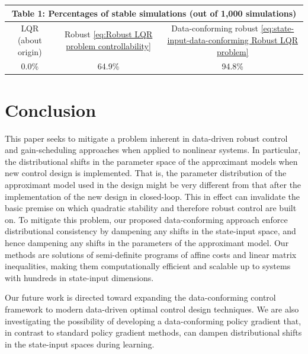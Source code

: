 \documentclass[letterpaper, 10 pt, conference]{ieeeconf}
\begin{document}
\begin{table}
\begin{center}
\begin{tabular}{ |c|c|c| } 
 \hline
 \multicolumn{3}{|c|}{Table 1: Percentages of stable simulations (out of 1,000 simulations)} \\
 \hline
 LQR (about origin) & Robust \eqref{eq:Robust LQR problem controllability} & Data-conforming robust \eqref{eq:state-input-data-conforming Robust LQR problem}\\
  \hline
  0.0\% & 64.9\% & 94.8\% \\
 \hline
\end{tabular}
\end{center}
\end{table}


\section{Conclusion} \label{section: Conclusion}
This paper seeks to mitigate a problem inherent in data-driven robust control and gain-scheduling approaches when applied to nonlinear systems. In particular, the distributional shifts in the parameter space of the approximant models when new control design is implemented. That is, the parameter distribution of the approximant model used in the design might be very different from that after the implementation of the new design in closed-loop. This in effect can invalidate the basic premise on which quadratic stability and therefore robust control are built on. To mitigate this problem, our proposed data-conforming approach enforce distributional consistency by dampening any shifts in the state-input space, and hence dampening any shifts in the parameters of the approximant model. Our methods are solutions of semi-definite programs of affine costs and linear matrix inequalities, making them computationally efficient and scalable up to systems with hundreds in state-input dimensions.

Our future work is directed toward expanding the data-conforming control framework to modern data-driven optimal control design techniques. We are also investigating the possibility of developing a data-conforming policy gradient that, in contrast to standard policy gradient methods, can dampen distributional shifts in the state-input spaces during learning.



\end{document}
